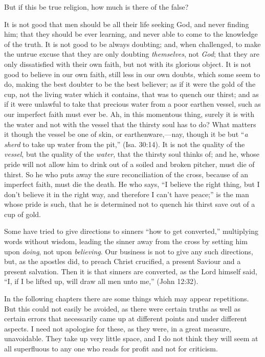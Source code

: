 \documentclass[
]{book}
\begin{document}
But if this be true religion, how much is there of the false?

It is not good that men should be all their life seeking God, and never finding him; that they should be ever learning, and never able to come to the knowledge of the truth. It is not good to be always doubting; and, when challenged, to make the untrue excuse that they are only doubting \emph{themselves}, not \emph{God}; that they are only dissatisfied with their own faith, but not with its glorious object. It is not good to believe in our own faith, still less in our own doubts, which some seem to do, making the best doubter to be the best believer; as if it were the gold of the cup, not the living water which it contains, that was to quench our thirst; and as if it were unlawful to take that precious water from a poor earthen vessel, such as our imperfect faith must ever be. Ah, in this momentous thing, surely it is with the water and not with the vessel that the thirsty soul has to do? What matters it though the vessel be one of skin, or earthenware,---nay, though it be but ``\emph{a sherd} to take up water from the pit,'' (Isa. 30:14). It is not the quality of the \emph{vessel}, but the quality of the \emph{water}, that the thirsty soul thinks of; and he, whose pride will not allow him to drink out of a soiled and broken pitcher, must die of thirst. So he who puts away the sure reconciliation of the cross, because of an imperfect faith, must die the death. He who says, ``I believe the right thing, but I don't believe it in the right way, and therefore I can't have peace;'' is the man whose pride is such, that he is determined not to quench his thirst save out of a cup of gold.

Some have tried to give directions to sinners ``how to get converted,'' multiplying words without wisdom, leading the sinner away from the cross by setting him upon \emph{doing}, not upon \emph{believing}. Our business is not to give any such directions, but, as the apostles did, to preach Christ crucified, a present Saviour and a present salvation. Then it is that sinners are converted, as the Lord himself said, ``I, if I be lifted up, will draw all men unto me,'' (John 12:32).

In the following chapters there are some things which may appear repetitions. But this could not easily be avoided, as there were certain truths as well as certain errors that necessarily came up at different points and under different aspects. I need not apologise for these, as they were, in a great measure, unavoidable. They take up very little space, and I do not think they will seem at all superfluous to any one who reads for profit and not for criticism.
\end{document}
